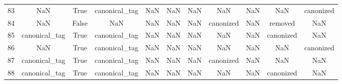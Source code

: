 \begin{table}[h!]
{\begin{tabular}{|c|c|c|c|c|c|c|c|c|c|c|}
         83 &                       NaN &                              True &                canonical\_tag &                                  NaN &                                  NaN &                                  NaN &                                  NaN &                                  NaN &                                  NaN &                                          canonized \\
         84 &                       NaN &                             False &                          NaN &                                  NaN &                                  NaN &                                  NaN &                            canonized &                                  NaN &                              removed &                                                NaN \\
         85 &             canonical\_tag &                              True &                canonical\_tag &                                  NaN &                                  NaN &                                  NaN &                                  NaN &                                  NaN &                            canonized &                                                NaN \\
         86 &                       NaN &                              True &                canonical\_tag &                                  NaN &                                  NaN &                                  NaN &                                  NaN &                                  NaN &                                  NaN &                                          canonized \\
         87 &             canonical\_tag &                              True &                canonical\_tag &                                  NaN &                                  NaN &                                  NaN &                            canonized &                                  NaN &                                  NaN &                                                NaN \\
         88 &             canonical\_tag &                              True &                canonical\_tag &                                  NaN &                                  NaN &                                  NaN &                                  NaN &                                  NaN &                            canonized &                                                NaN \\

\end{tabular}}
\end{table}
